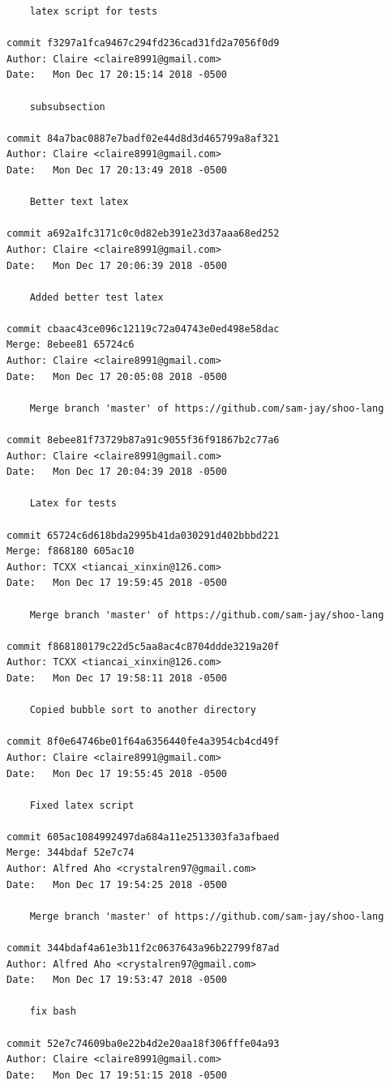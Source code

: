 \documentclass[12pt]{article}
\begin{document}
\begin{lstlisting}
    latex script for tests

commit f3297a1fca9467c294fd236cad31fd2a7056f0d9
Author: Claire <claire8991@gmail.com>
Date:   Mon Dec 17 20:15:14 2018 -0500

    subsubsection

commit 84a7bac0887e7badf02e44d8d3d465799a8af321
Author: Claire <claire8991@gmail.com>
Date:   Mon Dec 17 20:13:49 2018 -0500

    Better text latex

commit a692a1fc3171c0c0d82eb391e23d37aaa68ed252
Author: Claire <claire8991@gmail.com>
Date:   Mon Dec 17 20:06:39 2018 -0500

    Added better test latex

commit cbaac43ce096c12119c72a04743e0ed498e58dac
Merge: 8ebee81 65724c6
Author: Claire <claire8991@gmail.com>
Date:   Mon Dec 17 20:05:08 2018 -0500

    Merge branch 'master' of https://github.com/sam-jay/shoo-lang

commit 8ebee81f73729b87a91c9055f36f91867b2c77a6
Author: Claire <claire8991@gmail.com>
Date:   Mon Dec 17 20:04:39 2018 -0500

    Latex for tests

commit 65724c6d618bda2995b41da030291d402bbbd221
Merge: f868180 605ac10
Author: TCXX <tiancai_xinxin@126.com>
Date:   Mon Dec 17 19:59:45 2018 -0500

    Merge branch 'master' of https://github.com/sam-jay/shoo-lang

commit f868180179c22d5c5aa8ac4c8704ddde3219a20f
Author: TCXX <tiancai_xinxin@126.com>
Date:   Mon Dec 17 19:58:11 2018 -0500

    Copied bubble sort to another directory

commit 8f0e64746be01f64a6356440fe4a3954cb4cd49f
Author: Claire <claire8991@gmail.com>
Date:   Mon Dec 17 19:55:45 2018 -0500

    Fixed latex script

commit 605ac1084992497da684a11e2513303fa3afbaed
Merge: 344bdaf 52e7c74
Author: Alfred Aho <crystalren97@gmail.com>
Date:   Mon Dec 17 19:54:25 2018 -0500

    Merge branch 'master' of https://github.com/sam-jay/shoo-lang

commit 344bdaf4a61e3b11f2c0637643a96b22799f87ad
Author: Alfred Aho <crystalren97@gmail.com>
Date:   Mon Dec 17 19:53:47 2018 -0500

    fix bash

commit 52e7c74609ba0e22b4d2e20aa18f306fffe04a93
Author: Claire <claire8991@gmail.com>
Date:   Mon Dec 17 19:51:15 2018 -0500


\end{lstlisting}
\end{document}
